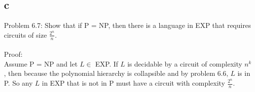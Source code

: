 \documentclass[letterpaper,notitlepage,twoside]{article}
\begin{document}
\subsection*{c}
Problem 6.7: Show that if P = NP, then there is a language in EXP that requires circuits of size $\frac{2^n}{n}$.
\\\\
Proof:
\\
Assume P = NP and let $L \in $ EXP. If $L$ is decidable by a circuit of complexity $n^k$, then because the polynomial hierarchy is collapsible and by problem 6.6, $L$ is in P. So any $L$ in EXP that is not in P must have a circuit with complexity $\frac{2^n}{n}$.
\end{document}
